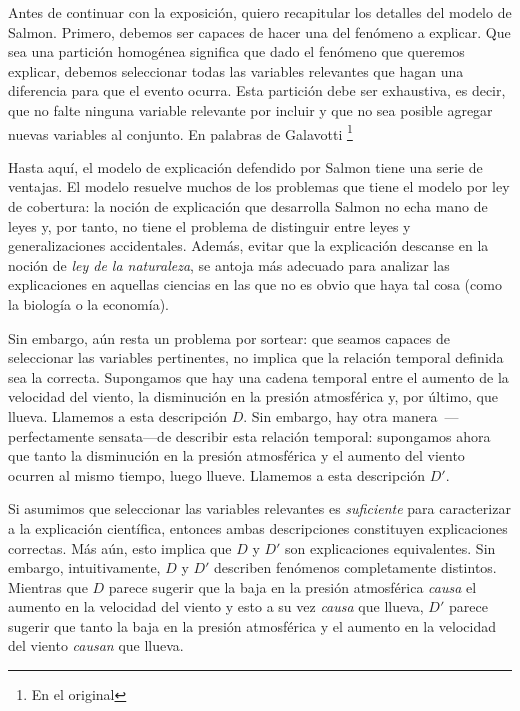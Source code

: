 Antes de continuar con la exposición, quiero recapitular
los detalles del modelo de Salmon. Primero, debemos ser
capaces de hacer una  del
fenómeno a explicar. Que sea una partición homogénea
significa que dado el fenómeno que queremos explicar,
debemos seleccionar todas las variables relevantes que
hagan una diferencia para que el evento ocurra. Esta
partición debe ser exhaustiva, es decir, que no falte
ninguna variable relevante por incluir y que no sea
posible agregar nuevas variables al conjunto. En palabras
de Galavotti \parencite{Galavotti2018}\footnote{
  En el original 
} 

Hasta aquí, el modelo de explicación defendido por Salmon
tiene una serie de ventajas. El modelo resuelve muchos de
los problemas que tiene el modelo por ley de cobertura: la
noción de explicación que desarrolla Salmon no echa mano de
leyes y, por tanto, no tiene el problema de distinguir entre
leyes y generalizaciones accidentales. Además, evitar que la
explicación descanse en la noción de \emph{ley de la
naturaleza}, se antoja más adecuado para analizar las
explicaciones en aquellas ciencias en las que no es obvio
que haya tal cosa (como la biología o la economía).

Sin embargo, aún resta un problema por sortear: que seamos
capaces de seleccionar las variables pertinentes, no implica
que la relación temporal definida sea la correcta.
Supongamos que hay una cadena temporal entre el aumento de
la velocidad del viento, la disminución en la presión
atmosférica y, por último, que llueva. Llamemos a esta
descripción $ D $. Sin embargo, hay otra
manera~---perfectamente sensata---de describir esta relación
temporal: supongamos ahora que tanto la disminución en la
presión atmosférica y el aumento del viento ocurren al mismo
tiempo, luego llueve. Llamemos a esta descripción $ D' $.

Si asumimos que seleccionar las variables relevantes es
\emph{suficiente} para caracterizar a la explicación
científica, entonces ambas descripciones constituyen
explicaciones correctas. Más aún, esto implica que $ D  $ y
$  D' $ son explicaciones equivalentes. Sin embargo,
intuitivamente, $ D $ y $ D' $ describen fenómenos
completamente distintos. Mientras que $ D $ parece sugerir
que la baja en la presión atmosférica \emph{causa} el
aumento en la velocidad del viento y esto a su vez
\emph{causa} que llueva, $ D' $ parece sugerir que tanto la
baja en la presión atmosférica y el aumento en la velocidad
del viento \emph{causan} que llueva.

